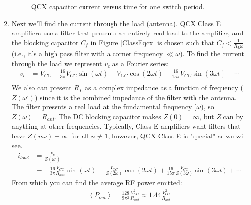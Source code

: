 \documentclass[10pt,letterpaper]{article}
\begin{document}
\begin{enumerate}
\begin{figure}
\centering
{}
\caption{QCX capacitor current versus time for one switch period.}
\label{QCXicplot}
\end{figure}

\item Next we'll find the current through the load (antenna). QCX Class E amplifiers use a filter that presents an entirely real load to the amplifier, and the blocking capacitor $C_f$ in Figure \ref{ClassEqcx} is chosen such that $C_f < \frac{1}{R_L\omega}$ (i.e., it's a high pass filter with a corner frequency $\ll \omega$). To find the current through the load we represent $v_c$ as a Fourier series:
\begin{align*}
v_c &= V_{CC}-\frac{ 16}{3\pi}V_{CC}\sin(\omega t)-V_{CC}\cos(2\omega t) + \frac{ 16}{15\pi}V_{CC}\sin(3\omega t)+\cdots\\
\end{align*}
We also can present $R_L$ as a complex impedance as a function of frequency ($Z(\omega')$) since it is the combined impedance of the filter with the antenna. The filter presents a real load at the fundamental frequency ($\omega$), so $Z(\omega)=R_{ant}$. The DC blocking capacitor makes $Z(0)=\infty$, but $Z$ can by anything at other frequencies. Typically, Class E amplifiers want filters that have $Z(n\omega)=\infty$ for all $n\neq 1$, however, QCX Class E is "special" as we will see.
\begin{align*}
i_{load}&=\frac{v_c}{Z(\omega')}\\
&= -\frac{ 16}{3\pi}\frac{ V_{CC}}{R_{ant}} \sin(\omega t)-\frac{V_{CC}}{Z(2\omega)}\cos(2\omega t) + \frac{ 16}{15\pi}\frac{V_{CC}}{Z(3\omega)}\sin(3\omega t)+\cdots
\end{align*}
From which you can find the average RF power emitted:
\begin{align*}
\left\langle P_{out} \right\rangle = \frac{ 128}{9\pi^2} \frac{ V_{CC}^2}{R_{ant}}\approx 1.44\frac{ V_{CC}^2}{R_{ant}}
\end{align*}


\end{enumerate}
\end{document}
